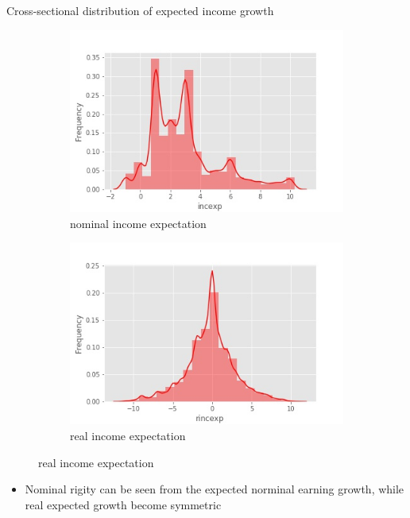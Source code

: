 \documentclass{beamer}
\begin{document}
\begin{frame}{Cross-sectional distribution of expected income growth}
	\begin{figure}
	\centering
	\label{incexp_hist}
	\begin{subfigure}[b]{0.45\textwidth}
		\centering
		\caption{nominal income expectation}
		\includegraphics[width=\textwidth]{figures/hist_incexp}
	\end{subfigure}
	\begin{subfigure}[b]{0.45\textwidth}
		\centering
		\caption{real income expectation}
		\includegraphics[width=\textwidth]{figures/hist_rincexp}
	\end{subfigure}
\end{figure}
	\begin{itemize}
		\item Nominal rigity can be seen from the expected norminal earning growth, while real expected growth become symmetric 
	\end{itemize}
\end{frame}
\end{document}
